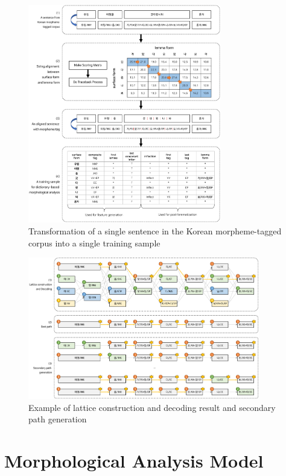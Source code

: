 \documentclass[AMS,STIX2COL]{WileyNJD-v2}
\begin{document}
    \begin{figure}[t]
        \centerline{\includegraphics[width=0.75\textwidth]{fig1.1}}
        \caption{Transformation of a single sentence in the Korean morpheme-tagged corpus into a single training sample}\label{fig:sample}
    \end{figure}


    \begin{figure}[t]
        \centerline{\includegraphics[width=0.9\textwidth]{fig2.1}}
        \caption{Example of lattice construction and decoding result and secondary path generation}\label{fig:lattice}
    \end{figure}


    \section{Morphological Analysis Model}\label{sec:morphological-analysis-model}
\end{document}
